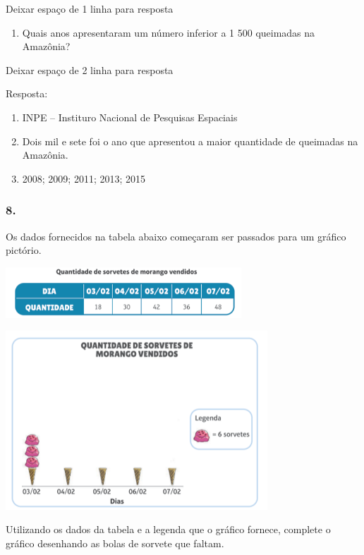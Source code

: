 Deixar espaço de 1 linha para resposta

\begin{enumerate}
\def\labelenumi{\alph{enumi})}
\item
  Quais anos apresentaram um número inferior a 1 500 queimadas na
  Amazônia?
\end{enumerate}

Deixar espaço de 2 linha para resposta

Resposta:

\begin{enumerate}
\def\labelenumi{\alph{enumi})}
\item
  INPE -- Instituro Nacional de Pesquisas Espaciais
\item
  Dois mil e sete foi o ano que apresentou a maior quantidade de
  queimadas na Amazônia.
\item
  2008; 2009; 2011; 2013; 2015
\end{enumerate}

\subsubsection{8.}\label{section-98}

Os dados fornecidos na tabela abaixo começaram ser passados para um
gráfico pictório.

\includegraphics[width=3.47436in,height=0.75022in]{media/image100.png}

\includegraphics[width=3.86538in,height=2.63899in]{media/image101.png}

Utilizando os dados da tabela e a legenda que o gráfico fornece,
complete o gráfico desenhando as bolas de sorvete que faltam.

